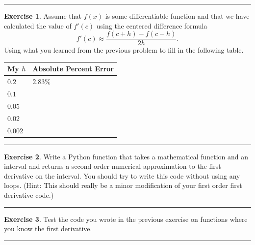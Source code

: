 \documentclass[
]{book}
\theoremstyle{definition}
\theoremstyle{definition}
\theoremstyle{definition}
\newtheorem{exercise}{Exercise}[chapter]
\theoremstyle{remark}
\begin{document}
\begin{center}\rule{0.5\linewidth}{0.5pt}\end{center}

\begin{exercise}
\protect\hypertarget{exr:unnamed-chunk-162}{}{\label{exr:unnamed-chunk-162} }Assume that \(f(x)\) is some differentiable function and that we have
calculated the value of \(f'(c)\) using the centered difference formula
\[f'(c) \approx \frac{f(c+h) - f(c-h)}{2h}.\] Using what you learned
from the previous problem to fill in the following table.

\begin{longtable}[]{@{}ll@{}}
\toprule
My \(h\) & Absolute Percent Error\tabularnewline
\midrule
\endhead
\(0.2\) & \(2.83\%\)\tabularnewline
\(0.1\) &\tabularnewline
\(0.05\) &\tabularnewline
\(0.02\) &\tabularnewline
\(0.002\) &\tabularnewline
\bottomrule
\end{longtable}
\end{exercise}

\begin{center}\rule{0.5\linewidth}{0.5pt}\end{center}

\begin{exercise}
\protect\hypertarget{exr:unnamed-chunk-163}{}{\label{exr:unnamed-chunk-163} }Write a Python function that takes a mathematical function and an interval and returns a second
order numerical approximation to the first derivative on the interval. You should try to write this code without using any loops. (Hint: This should really be a minor modification of your first order first derivative code.)
\end{exercise}

\begin{center}\rule{0.5\linewidth}{0.5pt}\end{center}

\begin{exercise}
\protect\hypertarget{exr:unnamed-chunk-164}{}{\label{exr:unnamed-chunk-164} }Test the code you wrote in the previous exercise on functions where you know the first derivative.
\end{exercise}

\begin{center}\rule{0.5\linewidth}{0.5pt}\end{center}
\end{document}
